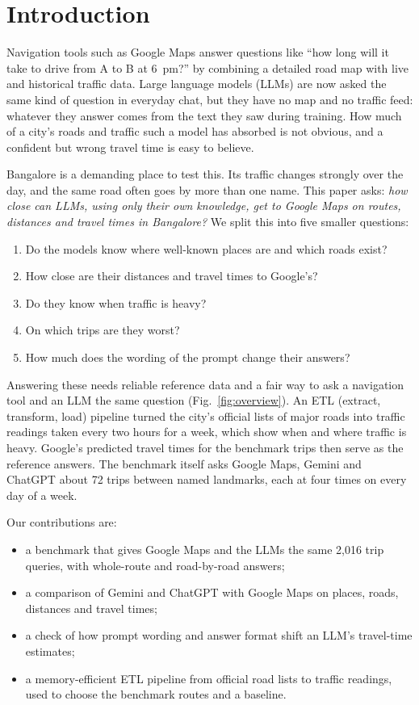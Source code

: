 \documentclass[conference]{IEEEtran}
\begin{document}
\section{Introduction}

Navigation tools such as Google Maps answer questions like ``how long will it take to drive from A to B at 6~pm?'' by combining a detailed road map with live and historical traffic data. Large language models (LLMs) are now asked the same kind of question in everyday chat, but they have no map and no traffic feed: whatever they answer comes from the text they saw during training. How much of a city's roads and traffic such a model has absorbed is not obvious, and a confident but wrong travel time is easy to believe.

Bangalore is a demanding place to test this. Its traffic changes strongly over the day, and the same road often goes by more than one name. This paper asks: \emph{how close can LLMs, using only their own knowledge, get to Google Maps on routes, distances and travel times in Bangalore?} We split this into five smaller questions:
\begin{enumerate}
\item Do the models know where well-known places are and which roads exist?
\item How close are their distances and travel times to Google's?
\item Do they know when traffic is heavy?
\item On which trips are they worst?
\item How much does the wording of the prompt change their answers?
\end{enumerate}

Answering these needs reliable reference data and a fair way to ask a navigation tool and an LLM the same question (Fig.~\ref{fig:overview}). An ETL (extract, transform, load) pipeline turned the city's official lists of major roads into traffic readings taken every two hours for a week, which show when and where traffic is heavy. Google's predicted travel times for the benchmark trips then serve as the reference answers. The benchmark itself asks Google Maps, Gemini and ChatGPT about 72 trips between named landmarks, each at four times on every day of a week.

Our contributions are:
\begin{itemize}
\item a benchmark that gives Google Maps and the LLMs the same 2,016 trip queries, with whole-route and road-by-road answers;
\item a comparison of Gemini and ChatGPT with Google Maps on places, roads, distances and travel times;
\item a check of how prompt wording and answer format shift an LLM's travel-time estimates;
\item a memory-efficient ETL pipeline from official road lists to traffic readings, used to choose the benchmark routes and a baseline.
\end{itemize}
\end{document}
